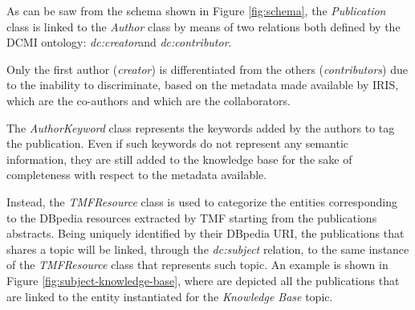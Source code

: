 \documentclass[%
    corpo=13.5pt,
    twoside,
    oldstyle,
    tipotesi=magistrale,
    greek,
    evenboxes
]{toptesi}
\begin{document}
As can be saw from the schema shown in Figure \ref{fig:schema}, the
\emph{Publication} class is linked to the \emph{Author} class by means of two
relations both defined by the DCMI ontology:
\emph{dc:creator}\footnotemark and \emph{dc:contributor}\footnotemark[\value{footnote}].

Only the first author (\emph{creator}) is differentiated from the
others (\emph{contributors}) due to the inability to discriminate, based
on the metadata made available by IRIS, which are the co-authors and which
are the collaborators.

The \emph{AuthorKeyword} class represents the keywords added by the authors
to tag the publication.
Even if such keywords do not represent any semantic information, they are still
added to the knowledge base for the sake of completeness with respect to
the metadata available.

Instead, the \emph{TMFResource} class is used to categorize the entities
corresponding to the DBpedia resources extracted by TMF starting from the
publications abstracts.
Being uniquely identified by their DBpedia URI, the publications that shares
a topic will be linked, through the \emph{dc:subject} relation, to the same
instance of the \emph{TMFResource} class that represents such topic.
An example is shown in Figure \ref{fig:subject-knowledge-base}, where are
depicted all the publications that are linked to the entity instantiated for
the \emph{Knowledge Base} topic.
\end{document}

